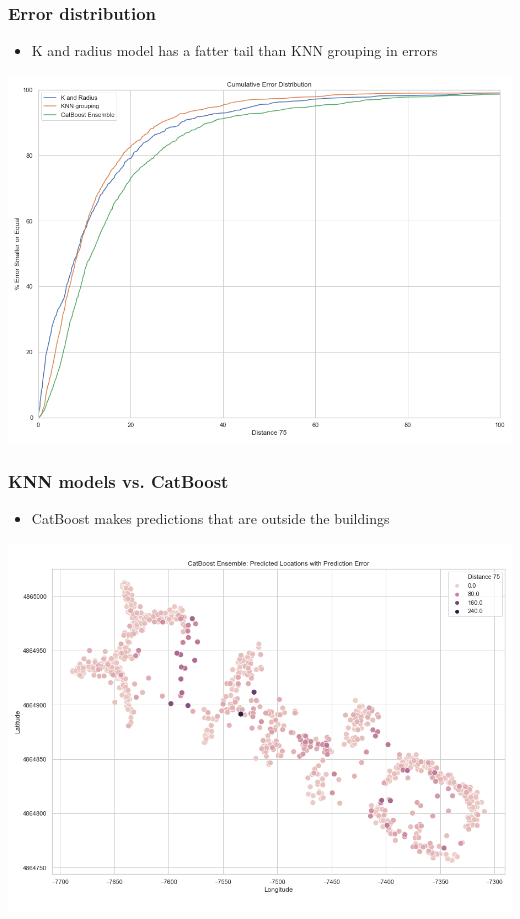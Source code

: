 \documentclass[10pt]{beamer}
\begin{document}
\begin{frame}
\frametitle{Error distribution}

\begin{itemize}
    \item K and radius model has a fatter tail than KNN grouping in errors
\end{itemize}

\includegraphics[width=\textwidth,height=\textheight,keepaspectratio]{error_cumulative.png}

\end{frame}


\begin{frame}
\frametitle{KNN models vs. CatBoost}

\begin{itemize}
    \item CatBoost makes predictions that are outside the buildings
\end{itemize}

\includegraphics[width=\textwidth,height=\textheight,keepaspectratio]{catboost_ensemble_error_of_predicted_locations.png}

\end{frame}
\end{document}
